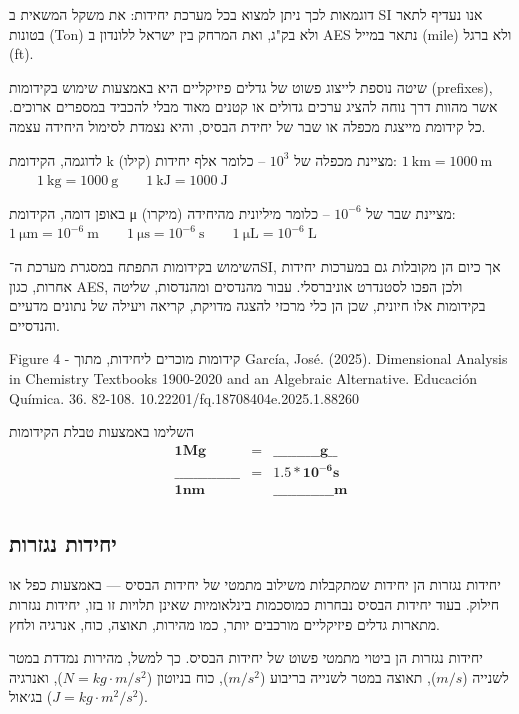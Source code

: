 \documentclass[
  hebrew,
  letterpaper,
  DIV=11,
  numbers=noendperiod]{scrreprt}
\begin{document}
דוגמאות לכך ניתן למצוא בכל מערכת יחידות: את משקל המשאית ב SI אנו נעדיף
לתאר בטונות (Ton) ולא בק"ג, ואת המרחק בין ישראל ללונדון ב AES נתאר במייל
(mile) ולא ברגל (ft).

שיטה נוספת לייצוג פשוט של גדלים פיזיקליים היא באמצעות שימוש בקידומות
(prefixes), אשר מהוות דרך נוחה להציג ערכים גדולים או קטנים מאוד מבלי
להכביד במספרים ארוכים. כל קידומת מייצגת מכפלה או שבר של יחידת הבסיס,
והיא נצמדת לסימול היחידה עצמה.

לדוגמה, הקידומת k (קילו) מציינת מכפלה של \(10^3\) -- כלומר אלף יחידות:
\(1~\text{km} = 1000~\text{m}\)  \(1~\text{kg} = 1000~\text{g}\)  \(1~\text{kJ} = 1000~\text{J}\)

באופן דומה, הקידומת μ (מיקרו) מציינת שבר של \(10^{-6}\) -- כלומר
מיליונית מהיחידה:
\(1~\text{μm} = 10^{-6}~\text{m}\)  \(1~\text{μs} = 10^{-6}~\text{s}\)  \(1~\text{μL} = 10^{-6}~\text{L}\)

השימוש בקידומות התפתח במסגרת מערכת ה־SI, אך כיום הן מקובלות גם במערכות
יחידות אחרות, כגון AES, ולכן הפכו לסטנדרט אוניברסלי. עבור מהנדסים
ומהנדסות, שליטה בקידומות אלו חיונית, שכן הן כלי מרכזי להצגה מדויקת,
קריאה ויעילה של נתונים מדעיים והנדסיים.

Figure {4 - קידומות מוכרים ליחידות, מתוך }García, José. (2025).
Dimensional Analysis in Chemistry Textbooks 1900-2020 and an Algebraic
Alternative. Educación Química. 36. 82-108.
10.22201/fq.18708404e.2025.1.88260

{השלימו באמצעות טבלת הקידומות} \[\begin{matrix}
\mathbf{1}\mathbf{Mg} & = & \_\_\_\_\_\_\_\_\_\_\mathbf{g}\_\_ \\
\_\_\_\_\_\_\_\_\_\_\_\_\_\_ & = & \mathbf{1.5*1}\mathbf{0}^{\mathbf{- 6}}\mathbf{s} \\
\mathbf{1}\mathbf{nm} & & \_\_\_\_\_\_\_\_\_\_\_\_\_\mathbf{m}
\end{matrix}\]

\subsection{\texorpdfstring{{יחידות
נגזרות}}{יחידות נגזרות}}\label{ux5d9ux5d7ux5d9ux5d3ux5d5ux5ea-ux5e0ux5d2ux5d6ux5e8ux5d5ux5ea}

יחידות נגזרות הן יחידות שמתקבלות משילוב מתמטי של יחידות הבסיס ---
באמצעות כפל או חילוק. בעוד יחידות הבסיס נבחרות כמוסכמות בינלאומיות שאינן
תלויות זו בזו, יחידות נגזרות מתארות גדלים פיזיקליים מורכבים יותר, כמו
מהירות, תאוצה, כוח, אנרגיה ולחץ.

יחידות נגזרות הן ביטוי מתמטי פשוט של יחידות הבסיס. כך למשל, מהירות נמדדת
במטר לשנייה (\(m/s\)), תאוצה במטר לשנייה בריבוע (\(m/s^{2}\)), כוח
בניוטון (\(N = kg \cdot m/s^{2}\)), ואנרגיה בג׳אול
(\(J = kg \cdot m^{2}/s^{2}\)).
\end{document}
